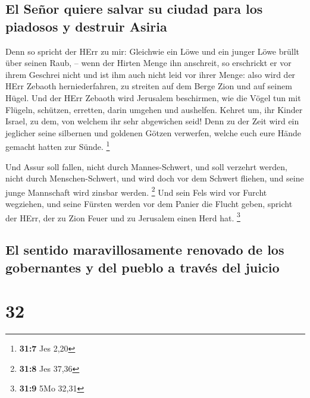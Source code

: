 \hypertarget{el-seuxf1or-quiere-salvar-su-ciudad-para-los-piadosos-y-destruir-asiria}{%
\subsection{El Señor quiere salvar su ciudad para los piadosos y
destruir
Asiria}\label{el-seuxf1or-quiere-salvar-su-ciudad-para-los-piadosos-y-destruir-asiria}}

 Denn so spricht der HErr zu mir: Gleichwie ein Löwe und
ein junger Löwe brüllt über seinen Raub, -- wenn der Hirten Menge ihn
anschreit, so erschrickt er vor ihrem Geschrei nicht und ist ihm auch
nicht leid vor ihrer Menge: also wird der HErr Zebaoth herniederfahren,
zu streiten auf dem Berge Zion und auf seinem Hügel.  Und
der HErr Zebaoth wird Jerusalem beschirmen, wie die Vögel tun mit
Flügeln, schützen, erretten, darin umgehen und aushelfen. 
Kehret um, ihr Kinder Israel, zu dem, von welchem ihr sehr abgewichen
seid!  Denn zu der Zeit wird ein jeglicher seine silbernen
und goldenen Götzen verwerfen, welche euch eure Hände gemacht hatten zur
Sünde. \footnote{\textbf{31:7} Jes 2,20}

 Und Assur soll fallen, nicht durch Mannes-Schwert, und
soll verzehrt werden, nicht durch Menschen-Schwert, und wird doch vor
dem Schwert fliehen, und seine junge Mannschaft wird zinsbar werden.
\footnote{\textbf{31:8} Jes 37,36}  Und sein Fels wird vor
Furcht wegziehen, und seine Fürsten werden vor dem Panier die Flucht
geben, spricht der HErr, der zu Zion Feuer und zu Jerusalem einen Herd
hat. \footnote{\textbf{31:9} 5Mo 32,31}

\hypertarget{el-sentido-maravillosamente-renovado-de-los-gobernantes-y-del-pueblo-a-travuxe9s-del-juicio}{%
\subsection{El sentido maravillosamente renovado de los gobernantes y
del pueblo a través del
juicio}\label{el-sentido-maravillosamente-renovado-de-los-gobernantes-y-del-pueblo-a-travuxe9s-del-juicio}}

\hypertarget{section-31}{%
\section{32}\label{section-31}}

